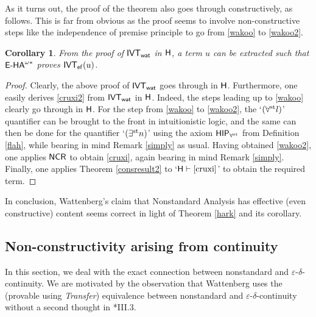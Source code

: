 \documentclass[reqno]{amsart}
\newtheorem{cor}[thm]{Corollary}
\def\H{\textup{\textsf{H}}}
\def\ef{\textup{\textsf{ef}}}
\def\IVT{\textup{IVT}}
\def\IVT{\textup{\textsf{IVT}}}
\def\st{\textup{st}}
\def\eps{\varepsilon}
\def\HIP{\textup{\textsf{HIP}}}
\def\IVT{\textup{\textsf{IVT}}}
\def\NCR{\textup{\textsf{NCR}}}
\def\wat{\textup{\textsf{wat}}}
\numberwithin{equation}{section}
\numberwithin{thm}{section}
\begin{document}
As it turns out, the proof of the theorem also goes through constructively, as follows.  
This is far from obvious as the proof seems to involve non-constructive steps like the independence of 
premise principle to go from \eqref{wakoo} to \eqref{wakoo2}.  
\begin{cor}
From the proof of $\IVT_{\textsf{\wat}}$ in $\H$, a term $u$ can be extracted such that $\textsf{\textup{E-HA}}^{\omega*}$ proves $\IVT_{\ef}(u)$.
\end{cor} 
\begin{proof}
Clearly, the above proof of $\IVT_{\wat}$ goes through in $\H$.  Furthermore, one easily derives \eqref{cruxi2} from $\IVT_{\wat}$ in $\H$.  Indeed, the steps leading up to \eqref{wakoo} clearly go through in $\H$.  For the step from \eqref{wakoo} to \eqref{wakoo2}, the `$(\forall^{\st}l)$' quantifier can be brought to the front in intuitionistic logic, and the same can then be done for the quantifier `$(\exists^{\st}n)$' using the axiom $\HIP_{\forall^{\st}}$ from Definition \ref{flah}, while bearing in mind Remark \ref{simply} as usual.  Having obtained \eqref{wakoo2}, one applies $\NCR$ to obtain \eqref{cruxi}, again bearing in mind Remark \ref{simply}.  Finally, one applies Theorem \ref{consresult2} to `$\H\vdash \eqref{cruxi}$' to obtain the required term.  
\end{proof}
In conclusion, Wattenberg's claim that Nonstandard Analysis has effective (even constructive) content seems correct in light of Theorem \ref{hark} and its corollary.  


\subsection{Non-constructivity arising from continuity}\label{good2}
In this section, we deal with the exact connection between nonstandard and $\eps$-$\delta$-continuity.  
We are motivated by the observation that Wattenberg %
uses the (provable using \emph{Transfer}) equivalence between nonstandard and $\eps$-$\delta$-continuity without a second thought in \cite{watje}*{III.3}.  

\medskip
\end{document}
